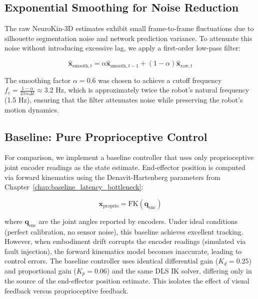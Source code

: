 \documentclass[12pt,a4paper,oneside]{report}
\begin{document}
\subsection{Exponential Smoothing for Noise Reduction}
\label{subsec:exponential_smoothing_for_noise_reduction}

The raw NeuroKin-3D estimates exhibit small frame-to-frame fluctuations due to silhouette segmentation noise and network prediction variance. To attenuate this noise without introducing excessive lag, we apply a first-order low-pass filter:

\begin{equation}
\hat{\mathbf{x}}_{\text{smooth},t} = \alpha \hat{\mathbf{x}}_{\text{smooth},t-1} + (1 - \alpha) \hat{\mathbf{x}}_{\text{raw},t}
\end{equation}

The smoothing factor $\alpha = 0.6$ was chosen to achieve a cutoff frequency $f_c = \frac{1-\alpha}{2\pi \alpha \Delta t} \approx 3.2$ Hz, which is approximately twice the robot's natural frequency (1.5 Hz), ensuring that the filter attenuates noise while preserving the robot's motion dynamics.

\subsection{Baseline: Pure Proprioceptive Control}
\label{subsec:baseline_pure_proprioceptive_control}

For comparison, we implement a baseline controller that uses only proprioceptive joint encoder readings as the state estimate. End-effector position is computed via forward kinematics using the Denavit-Hartenberg parameters from Chapter~\ref{chap:baseline_latency_bottleneck}:

\begin{equation}
\mathbf{x}_{\text{proprio}} = \text{FK}(\mathbf{q}_{\text{enc}})
\end{equation}

where $\mathbf{q}_{\text{enc}}$ are the joint angles reported by encoders. Under ideal conditions (perfect calibration, no sensor noise), this baseline achieves excellent tracking. However, when embodiment drift corrupts the encoder readings (simulated via fault injection), the forward kinematics model becomes inaccurate, leading to control errors. The baseline controller uses identical differential gain ($K_d = 0.25$) and proportional gain ($K_p = 0.06$) and the same DLS IK solver, differing only in the source of the end-effector position estimate. This isolates the effect of visual feedback versus proprioceptive feedback.
\end{document}
